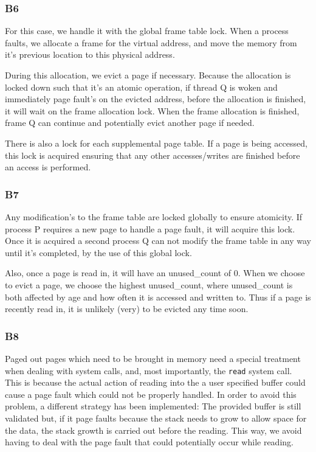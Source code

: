 \documentclass[a4wide, 11pt]{article}
\newcommand{\tx}{\texttt}
\begin{document}
\subsubsection{B6}

For this case, we handle it with the global frame table lock. When a process faults, we allocate a frame for the virtual address, and move the memory from it's previous location to this physical address.

During this allocation, we evict a page if necessary. Because the allocation is locked down such that it's an atomic operation, if thread Q is woken and immediately page fault's on the evicted address, before the allocation is finished, it will wait on the frame allocation lock. When the frame allocation is finished, frame Q can continue and potentially evict another page if needed.

There is also a lock for each supplemental page table. If a page is being accessed, this lock is acquired ensuring that any other accesses/writes are finished before an access is performed.

\subsubsection{B7}

Any modification's to the frame table are locked globally to ensure atomicity. If process P requires a new page to handle a page fault, it will acquire this lock. Once it is acquired a second process Q can not modify the frame table in any way until it's completed, by the use of this global lock.

Also, once a page is read in, it will have an unused\_count of 0. When we choose to evict a page, we choose the highest unused\_count, where unused\_count is both affected by age and how often it is accessed and written to. Thus if a page is recently read in, it is unlikely (very) to be evicted any time soon.

\subsubsection{B8}
Paged out pages which need to be brought in memory need a special treatment when dealing with system calls, and, most importantly, the \tx{read} system call. This is because the actual action of reading into the a user specified buffer could cause a page fault which could not be properly handled. In order to avoid this problem, a different strategy has been implemented: The provided buffer is still validated but, if it page faults because the stack needs to grow to allow space for the data, the stack growth is carried out before the reading. This way, we avoid having to deal with the page fault that could potentially occur while reading.  
\end{document}
